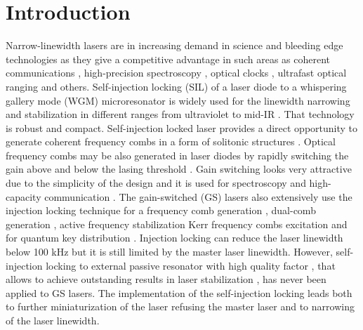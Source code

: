 \documentclass[a4paper, amsfonts, amssymb, amsmath, reprint, showkeys, nofootinbib, twoside,longbibliography, aps]{revtex4-1}
\begin{document}
\section{Introduction}
Narrow-linewidth lasers are in increasing demand in science and bleeding edge technologies as they give a competitive advantage in such areas as coherent communications \cite{fulop2018high}, high-precision spectroscopy \cite{Suh600,Yang:19}, optical clocks \cite{Papp:14,Newman:19},  ultrafast optical ranging \cite{Suh2018,Trocha2018,Riemensberger2020} and others. Self-injection locking (SIL) of a laser diode to a whispering gallery mode (WGM) microresonator is widely used for the linewidth narrowing and stabilization in different ranges from ultraviolet to mid-IR \cite{VASSILIEV1998305, savchenkov2019self, Liang2015, Dale:16, Savchenkov:19a, shitikov2020microresonator, Coupling18}. That technology is robust and compact. Self-injection locked laser provides a direct opportunity to generate coherent frequency combs in a form of solitonic structures \cite{ Pavlov2018, raja2019electrically, shen2020integrated, kondratiev2020numerical, lobanov2020generation, VoloshinDynamics}. Optical frequency combs may be also generated in laser diodes by rapidly switching the gain above and below the lasing threshold \cite{anandarajah2011generation}. Gain switching looks very attractive due to the simplicity of the design and it is used for spectroscopy \cite{jerez2016dual} and high-capacity communication \cite{pfeifle2015flexible}. The gain-switched (GS) lasers  also extensively use the injection locking technique for a frequency comb generation \cite{quirce2020nonlinear, zhu2016novel}, dual-comb generation \cite{quevedo2020gain}, active frequency stabilization \cite{liekhus2012injection} Kerr frequency combs excitation \cite{Wengeaba2807} and for quantum key distribution \cite{comandar2016quantum}. Injection locking can reduce the laser linewidth below 100 kHz \cite{zhou201140nm} but it is still limited by the master laser linewidth. However, self-injection locking to external passive resonator with high quality factor \cite{lin2017nonlinear}, that allows to achieve outstanding results in laser stabilization \cite{jin2020hertz, lim2017microresonator}, has never been applied to GS lasers. The implementation of the self-injection locking leads both to further miniaturization of the laser refusing the master laser and to narrowing of the laser linewidth.
\end{document}
